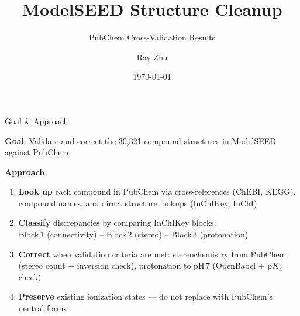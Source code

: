 \documentclass[aspectratio=169,11pt]{beamer}
\title{ModelSEED Structure Cleanup}
\subtitle{PubChem Cross-Validation Results}
\author{Ray Zhu}
\date{\today}
\begin{document}
\begin{frame}
\titlepage
\end{frame}

\begin{frame}{Goal \& Approach}

\textbf{Goal}: Validate and correct the 30,321 compound structures in
ModelSEED against PubChem.

\bigskip
\textbf{Approach}:
\begin{enumerate}\setlength\itemsep{4pt}
  \item \textbf{Look up} each compound in PubChem via cross-references
        (ChEBI, KEGG), compound names, and direct structure lookups
        (InChIKey, InChI)
  \item \textbf{Classify} discrepancies by comparing InChIKey blocks:\\
        {\small Block\,1 (connectivity) -- Block\,2 (stereo) -- Block\,3 (protonation)}
  \item \textbf{Correct} when validation criteria are met: stereochemistry
        from PubChem (stereo count + inversion check), protonation to pH\,7
        (OpenBabel + $\text{p}K_\text{a}$ check)
  \item \textbf{Preserve} existing ionization states --- do not
        replace with PubChem's neutral forms
\end{enumerate}

\end{frame}
\end{document}
